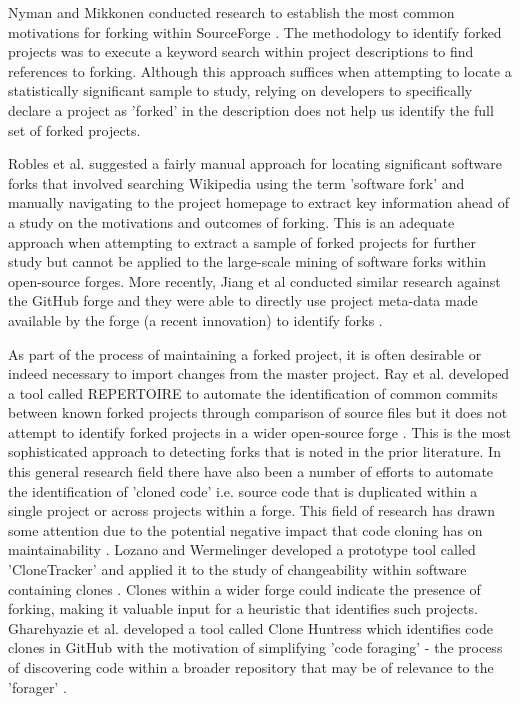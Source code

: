 Nyman and Mikkonen conducted research to establish the most common motivations for forking within SourceForge \citep{nyman2011fork}. The methodology to identify forked projects was to execute a keyword search within project descriptions to find references to forking. Although this approach suffices when attempting to locate a statistically significant  sample to study, relying on developers to specifically declare a project as 'forked' in the description does not help us identify the full set of forked projects.

Robles et al. \citep{robles2006mining} suggested a fairly manual approach for locating significant software forks that involved searching Wikipedia using the term 'software fork' and manually navigating to the project homepage to extract key information ahead of a study on the motivations and outcomes of forking. This is an adequate approach when attempting to extract a sample of forked projects for further study but cannot be applied to the large-scale mining of software forks within open-source forges. More recently, Jiang et al conducted similar research against the GitHub forge and they were able to directly use project meta-data made available by the forge (a recent innovation) to identify forks \citep{jiang2017and}.

As part of the process of maintaining a forked project, it is often desirable or indeed necessary to import changes from the master project. Ray et al. developed a tool called REPERTOIRE to automate the identification of common commits between known forked projects through comparison of source files but it does not attempt to identify forked projects in a wider open-source forge \citep{ray2012repertoire}. This is the most sophisticated approach to detecting forks that is noted in the prior literature. In this general research field there have also been a number of efforts to automate the identification of 'cloned code' i.e. source code that is duplicated within a single project or across projects within a forge. This field of research has drawn some attention due to the potential negative impact that code cloning has on maintainability \citep{lozano2007evaluating}. Lozano and Wermelinger developed a prototype tool called 'CloneTracker' and applied it to the study of changeability within software containing clones \citep{lozano2008assessing}. Clones within a wider forge could indicate the presence of forking, making it valuable input for a heuristic that identifies such projects. Gharehyazie et al. developed a tool called Clone Huntress which identifies code clones in GitHub with the motivation of simplifying 'code foraging' - the process of discovering code within a broader repository that may be of relevance to the 'forager' \citep{gharehyazie2018cross}.

